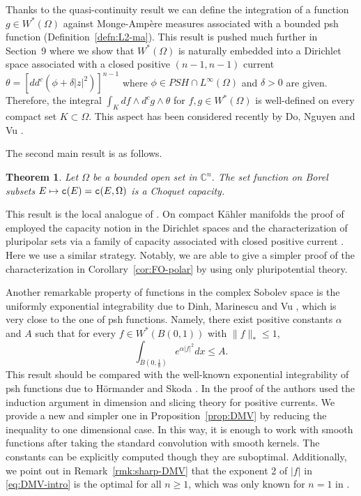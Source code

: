 \documentclass{amsart}
\newcommand{\al}{\alpha}
\newcommand{\de}{\delta}
\newcommand{\te}{\theta}
\newcommand{\tc}{{\tt c}}
\newcommand{\Om}{\Omega}
\newcommand{\bC}{\mathbb{C}}
\newtheorem{thm}{Theorem}
\theoremstyle{definition}
\numberwithin{thm}{section}
\numberwithin{equation}{section}
\renewcommand{\[}{\begin{equation}}
\renewcommand{\]}{\end{equation}}
\newcommand{\wed}{\wedge}
\begin{document}
Thanks to the quasi-continuity result 
 we can define the integration of a function $g\in W^*(\Om)$ against  Monge-Amp\`ere measures associated with a bounded psh function (Definition~\ref{defn:L2-ma}). This result is pushed much further in Section~9 where we show that $W^*(\Om)$ is  naturally embedded  into a Dirichlet space associated with a closed positive  $(n-1,n-1)$ current $
\te = [dd^c (\phi + \de |z|^2)]^{n-1}$ where $\phi \in PSH \cap L^\infty(\Om)$ and $\de>0$ are given.
Therefore, the integral  $\int_K df \wed d^c g\wed \te$ for $f,g\in W^*(\Om)$ is well-defined on every compact set $K\subset \Om$. This aspect has been considered recently by Do, Nguyen and Vu \cite{DNV25}.

The second main result is as follows. 
\begin{thm}\label{thm:intro-choquet-c} Let $\Om$ be a bounded open set in $\bC^n$. The set function on Borel subsets $E\mapsto \tc (E)= \tc (E,\Om)$ is a Choquet capacity.
\end{thm}

This result is the local analogue of \cite{Vigny}. On compact K\"ahler manifolds the proof of  \cite[Theorem~30]{Vigny} employed the capacity notion in the Dirichlet spaces \cite[Lemma~23]{Vigny} and the characterization of pluripolar sets via a family of capacity associated with closed positive current \cite{FO84}.  Here we use a similar strategy. Notably, we are able to give a simpler proof of the characterization in Corollary~\ref{cor:FO-polar} by using only pluripotential theory. 

Another remarkable property of functions in the complex Sobolev space is the uniformly exponential integrability due to Dinh, Marinescu and Vu  \cite{DMV}, which is very close to the one of psh functions.  Namely, 
there exist positive constants $\al$ and $A$  such that for every $f \in W^*(B(0,1))$ with $\|f\|_*\leq 1$, 
\[\label{eq:DMV-intro}
	\int_{\bar B(0,\frac{1}{8})} e^{\al |f|^2} d x \leq A.
\]
This result should be compared with the well-known exponential integrability of psh functions due to H\"ormander \cite[Proposition~4.2.9]{Ho07} and Skoda \cite{Sk72}. In the proof of  \cite[Theorem~1.2]{DMV}  the authors used the induction argument in dimension and slicing theory for positive currents. We provide a new and simpler one in Proposition~\ref{prop:DMV} by reducing the inequality to one dimensional case. In this way, it is enough  to  work with smooth functions after taking  the standard convolution with smooth kernels. The constants can be explicitly computed though they  are suboptimal.  Additionally, we point out in Remark~\ref{rmk:sharp-DMV} that the exponent 2 of $|f|$ in \eqref{eq:DMV-intro} is the optimal for all $n\geq 1$, which was only known for $n=1$ in \cite{DMV}. 
\end{document}
